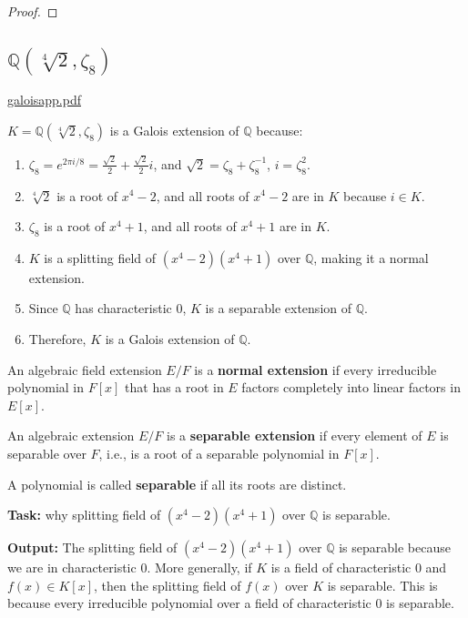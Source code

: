 \begin{proof}
\end{proof}

\subsection{\texorpdfstring{$\mathbb{Q}(\sqrt[4]{ 2 },\zeta_8)$}{mathbbQ(sqrt[4] 2 ,zeta_8)}}

\href{https://kconrad.math.uconn.edu/blurbs/galoistheory/galoisapp.pdf}{galoisapp.pdf}

$K = \mathbb{Q}(\sqrt[4]{ 2 }, \zeta_8)$ is a Galois extension of $\mathbb{Q}$ because:

\begin{enumerate}
	\item $\zeta_8 = e^{2\pi i / 8} = \frac{\sqrt{2}}{2} + \frac{\sqrt{2}}{2}i$, and $\sqrt{2} = \zeta_8 + \zeta_8^{-1}$, $i = \zeta_8^2$.
	\item $\sqrt[4]{ 2 }$ is a root of $x^4-2$, and all roots of $x^4-2$ are in $K$ because $i \in K$.
	\item $\zeta_8$ is a root of $x^4+1$, and all roots of $x^4+1$ are in $K$.
	\item $K$ is a splitting field of $(x^4-2)(x^4+1)$ over $\mathbb{Q}$, making it a normal extension.
	\item Since $\mathbb{Q}$ has characteristic 0, $K$ is a separable extension of $\mathbb{Q}$.
	\item Therefore, $K$ is a Galois extension of $\mathbb{Q}$.
\end{enumerate}

\begin{definition}
An algebraic field extension $E/F$ is a \textbf{normal extension} if every irreducible polynomial in $F[x]$ that has a root in $E$ factors completely into linear factors in $E[x]$.
\end{definition}
\begin{definition}
An algebraic extension $E/F$ is a \textbf{separable extension} if every element of $E$ is separable over $F$, i.e., is a root of a separable polynomial in $F[x]$.
\end{definition}
\begin{definition}
A polynomial is called \textbf{separable} if all its roots are distinct.
\end{definition}
\textbf{Task:} why splitting field of $(x^4-2)(x^4+1)$ over $\mathbb{Q}$ is separable.

\textbf{Output:}
The splitting field of $(x^4-2)(x^4+1)$ over $\mathbb{Q}$ is separable because we are in characteristic 0. More generally, if $K$ is a field of characteristic 0 and $f(x) \in K[x]$, then the splitting field of $f(x)$ over $K$ is separable. This is because every irreducible polynomial over a field of characteristic 0 is separable.

